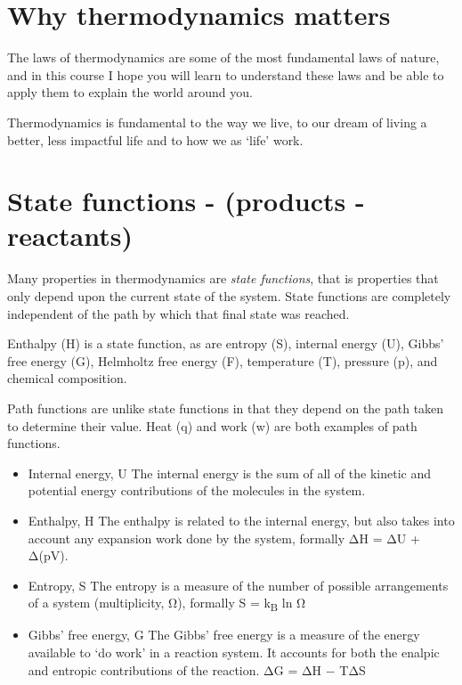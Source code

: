 \documentclass[
]{book}
\begin{document}
\hypertarget{sec:whyjustwhy}{%
\section{Why thermodynamics matters}\label{sec:whyjustwhy}}

The laws of thermodynamics are some of the most fundamental laws of nature, and in this course I hope you will learn to understand these laws and be able to apply them to explain the world around you.

Thermodynamics is fundamental to the way we live, to our dream of living a better, less impactful life and to how we as `life' work.

\hypertarget{sec:state}{%
\section{State functions - (products - reactants)}\label{sec:state}}

Many properties in thermodynamics are \emph{state functions}, that is properties that only depend upon the current state of the system. State functions are completely independent of the path by which that final state was reached.

Enthalpy (H) is a state function, as are entropy (S), internal energy (U), Gibbs' free energy (G), Helmholtz free energy (F), temperature (T), pressure (p), and chemical composition.

Path functions are unlike state functions in that they depend on the path taken to determine their value.
Heat (q) and work (w) are both examples of path functions.

\begin{itemize}
\item
  Internal energy, U The internal energy is the sum of all of the kinetic and potential energy contributions of the molecules in the system.
\item
  Enthalpy, H The enthalpy is related to the internal energy, but also takes into account any expansion work done by the system, formally ΔH = ΔU + Δ(pV).
\item
  Entropy, S The entropy is a measure of the number of possible arrangements of a system (multiplicity, Ω), formally S = k\textsubscript{B} ln Ω
\item
  Gibbs' free energy, G The Gibbs' free energy is a measure of the energy available to `do work' in a reaction system. It accounts for both the enalpic and entropic contributions of the reaction. ΔG = ΔH − TΔS
\end{itemize}
\end{document}
